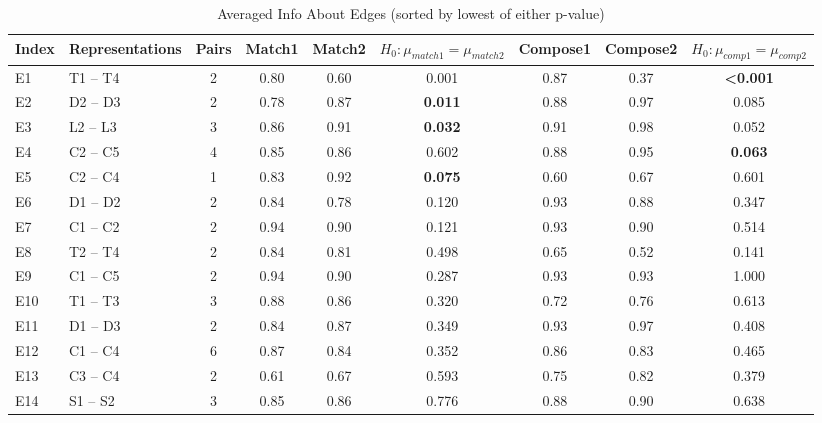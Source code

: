 \begin{table*}\begin{small}\begin{center}\caption{Averaged Info About Edges (sorted by lowest of either p-value)}\label{table:testedEdgesTable}\begin{tabular}
{llccccccc}
Index & Representations & Pairs & Match1 & Match2 & $H_0: \mu_{match1} = \mu_{match2}$ & Compose1 & Compose2 &  $H_0: \mu_{comp1} = \mu_{comp2}$ \\
\toprule[0.16em]
E1 & T1 -- T4 & 2 & 0.80 & 0.60 & 0.001 & 0.87 & 0.37 & \textbf{<0.001}\\
E2 & D2 -- D3 & 2 & 0.78 & 0.87 & \textbf{0.011} & 0.88 & 0.97 & 0.085\\
E3 & L2 -- L3 & 3 & 0.86 & 0.91 & \textbf{0.032} & 0.91 & 0.98 & 0.052\\
E4 & C2 -- C5 & 4 & 0.85 & 0.86 & 0.602 & 0.88 & 0.95 & \textbf{0.063}\\
E5 & C2 -- C4 & 1 & 0.83 & 0.92 & \textbf{0.075} & 0.60 & 0.67 & 0.601\\
\midrule[0.16em]
E6 & D1 -- D2 & 2 & 0.84 & 0.78 & 0.120 & 0.93 & 0.88 & 0.347\\
E7 & C1 -- C2 & 2 & 0.94 & 0.90 & 0.121 & 0.93 & 0.90 & 0.514\\
E8 & T2 -- T4 & 2 & 0.84 & 0.81 & 0.498 & 0.65 & 0.52 & 0.141\\
E9 & C1 -- C5 & 2 & 0.94 & 0.90 & 0.287 & 0.93 & 0.93 & 1.000\\
E10 & T1 -- T3 & 3 & 0.88 & 0.86 & 0.320 & 0.72 & 0.76 & 0.613\\
E11 & D1 -- D3 & 2 & 0.84 & 0.87 & 0.349 & 0.93 & 0.97 & 0.408\\
E12 & C1 -- C4 & 6 & 0.87 & 0.84 & 0.352 & 0.86 & 0.83 & 0.465\\
E13 & C3 -- C4 & 2 & 0.61 & 0.67 & 0.593 & 0.75 & 0.82 & 0.379\\
E14 & S1 -- S2 & 3 & 0.85 & 0.86 & 0.776 & 0.88 & 0.90 & 0.638\\
\bottomrule[0.13em]\end{tabular}\end{center}\end{small}\end{table*}
